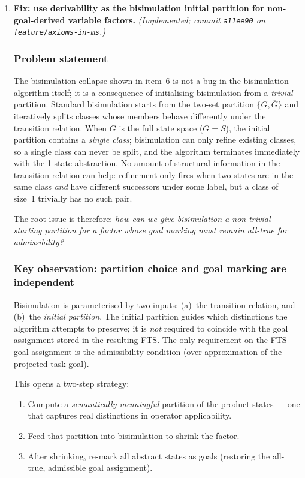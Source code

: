 \documentclass[11pt,a4paper]{article}
\begin{document}
\begin{enumerate}
  \item \label{item:derivability-partition}
    \textbf{Fix: use derivability as the bisimulation initial
    partition for non-goal-derived variable factors.}
    \emph{(Implemented; commit \texttt{a11ee90} on \texttt{feature/axioms-in-ms}.)}


    \subsubsection*{Problem statement}

    The bisimulation collapse shown in item~6 is not a bug in the
    bisimulation algorithm itself; it is a consequence of initialising
    bisimulation from a \emph{trivial} partition.  Standard bisimulation
    starts from the two-set partition $\{G, \overline{G}\}$ and iteratively
    splits classes whose members behave differently under the transition
    relation.  When $G$ is the full state space ($G = S$), the initial
    partition contains a \emph{single class}; bisimulation can only refine
    existing classes, so a single class can never be split, and the algorithm
    terminates immediately with the 1-state abstraction.  No amount of
    structural information in the transition relation can help: refinement
    only fires when two states are in the same class \emph{and} have
    different successors under some label, but a class of size~1 trivially
    has no such pair.

    The root issue is therefore: \textit{how can we give bisimulation a
    non-trivial starting partition for a factor whose goal marking must remain
    all-true for admissibility?}

    \subsubsection*{Key observation: partition choice and goal marking are
    independent}

    Bisimulation is parameterised by two inputs: (a)~the transition relation,
    and (b)~the \emph{initial partition}.  The initial partition guides which
    distinctions the algorithm attempts to preserve; it is \emph{not} required
    to coincide with the goal assignment stored in the resulting FTS.  The
    only requirement on the FTS goal assignment is the admissibility
    condition (over-approximation of the projected task goal).

    This opens a two-step strategy:
    \begin{enumerate}
      \item Compute a \emph{semantically meaningful} partition of the product
        states --- one that captures real distinctions in operator
        applicability.
      \item Feed that partition into bisimulation to shrink the factor.
      \item After shrinking, re-mark all abstract states as goals (restoring
        the all-true, admissible goal assignment).
    \end{enumerate}


\end{enumerate}
\end{document}

